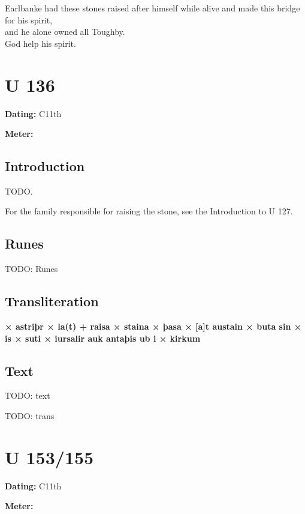 \bpb Earlbanke had these stones raised after himself while alive and made this bridge for his spirit, \\
and he alone owned all Toughby. \\
God help his spirit.\epb\epg

\sectionline\clearpage


\section{U 136}

\begin{flushright}%
\textbf{Dating:} C11th

\textbf{Meter:} \Fornyrdislag
\end{flushright}%

\subsection{Introduction}

TODO.

For the family responsible for raising the stone, see the Introduction to U 127.

\subsection{Runes}

TODO: Runes%

\subsection{Transliteration}

\textbf{× astriþr × la(t) + raisa × staina × þasa × [a]t austain × buta sin × is × suti × iursalir auk antaþis ub i × kirkum}

\subsection{Text}

\bpg\bpa[0]%
TODO: text\epa

\bpb TODO: trans\epb\epg

\sectionline\clearpage


\section{U 153/155}

\begin{flushright}%
\textbf{Dating:} C11th

\textbf{Meter:} \Fornyrdislag
\end{flushright}%

